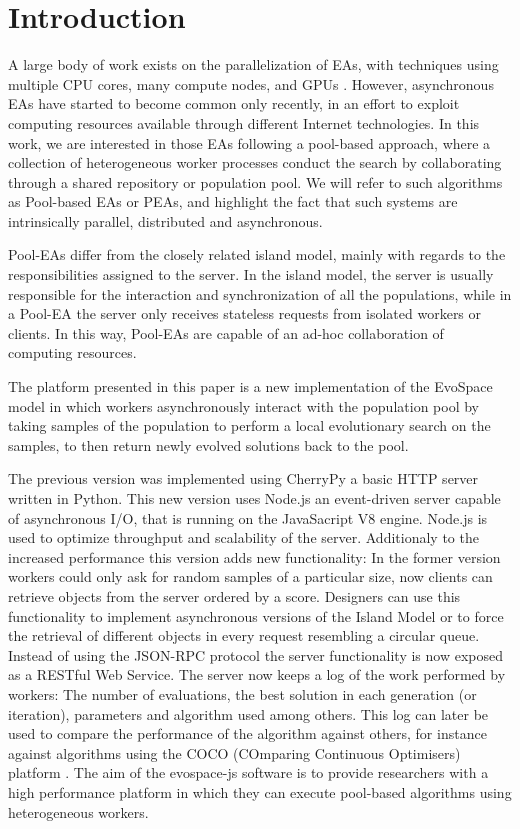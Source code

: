 \section{Introduction}
A large body of work exists on the parallelization of EAs,
with techniques using multiple CPU cores, many compute nodes, 
and GPUs \cite{cantu2000efficient,hofmann2013performance}. 
However, asynchronous EAs have started to become common only
recently, in an effort to exploit computing resources available
through different Internet technologies. In this work, we are
interested in those EAs following a pool-based approach,
where a collection of heterogeneous worker processes 
conduct the search by collaborating through a shared 
repository or population pool. We will refer to such algorithms 
as Pool-based EAs or PEAs, and highlight the fact that 
such systems are intrinsically parallel, distributed and asynchronous.

Pool-EAs differ from the closely related island model, 
mainly with regards to the responsibilities assigned to 
the server. In the island model, the server is usually 
responsible for the interaction and synchronization of 
all the populations, while in a Pool-EA the server only 
receives stateless requests from isolated workers 
or clients. In this way, Pool-EAs are capable of an 
ad-hoc collaboration of computing resources. 

The platform presented in this paper is a new implementation 
of the EvoSpace model \cite{GValdez2015} in which 
workers asynchronously interact with the population 
pool by taking samples of the population 
to perform a local evolutionary search on the samples, 
to then return newly evolved solutions back to the pool.

The previous version was implemented using CherryPy a basic HTTP 
server written in Python. This new version uses Node.js an 
event-driven server capable of asynchronous I/O, that is 
running on the JavaSacript V8 engine. Node.js is used 
to optimize throughput and scalability of the server.
Additionaly to the  increased performance this version 
adds new functionality: In the former version workers could only
ask for random samples of a particular size, now clients 
can retrieve objects from the server ordered by a score. 
Designers can use this functionality to implement 
asynchronous versions of the Island Model or to force 
the retrieval of different objects in every request 
resembling a circular queue. Instead of using the JSON-RPC 
protocol the server functionality is now exposed as a RESTful 
Web Service. The server now keeps a log of the work performed 
by workers: The number of evaluations, the best solution in each 
generation (or iteration), parameters and algorithm used among others.
This log can later be used to compare the performance of 
the algorithm against others, for instance against 
algorithms using the COCO (COmparing Continuous Optimisers)
platform \cite{hansen2016coco}.
The aim of the evospace-js software is to provide 
researchers with a high performance platform in which 
they can execute pool-based algorithms using heterogeneous workers. 

